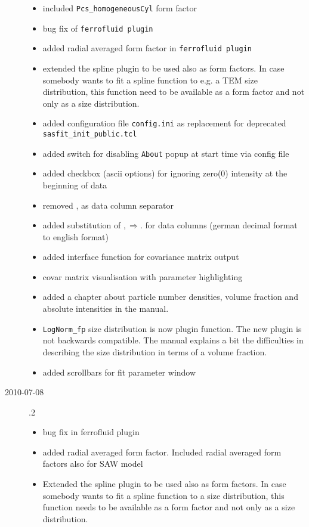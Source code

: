 \begin{description}
\begin{itemize}
        \item included \texttt{Pcs\_homogeneousCyl} form factor
        \item bug fix of \texttt{ferrofluid plugin}
        \item added radial averaged form factor in \texttt{ferrofluid plugin}
        \item extended the spline plugin to be used also as form factors.
            In case somebody wants to fit a spline function to e.g. a TEM size distribution,
            this function need to be available as a form factor and not only as a size
            distribution.
        \item added configuration file \texttt{config.ini} as replacement for
            deprecated \texttt{sasfit\_init\_public.tcl}
        \item added switch for disabling \texttt{About} popup at start time via config file
        \item added checkbox (ascii options) for ignoring zero(0) intensity at the beginning
                of data
        \item removed , as data column separator
        \item added substitution of $, \Rightarrow .$   for data columns
                (german decimal format to english format)
        \item added interface function for covariance matrix output
        \item covar matrix visualisation with parameter highlighting
        \item added a chapter about particle number densities, volume fraction
            and absolute intensities in the manual.
        \item \texttt{LogNorm\_fp} size distribution is now plugin function.
            The new plugin is not backwards compatible.
            The manual explains a bit the difficulties in describing the size distribution
            in terms of a volume fraction.
        \item added scrollbars for fit parameter window
        \end{itemize}
    \item[2010-07-08] .2
        \begin{itemize}
        \item bug fix in ferrofluid plugin
        \item added radial averaged form factor. Included radial averaged form factors also for SAW model
        \item Extended the spline plugin to be used also as form factors. In case somebody wants to fit a spline function to a size distribution, this function needs to be available as a form factor and not only as a size distribution.

\end{itemize}
\end{description}
